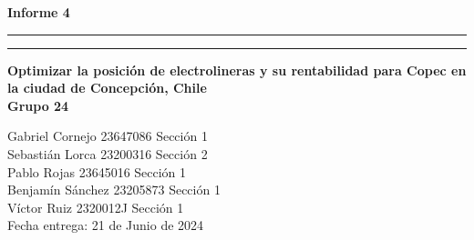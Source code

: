 \documentclass[letterpaper]{article}
\begin{document}
\hfill
\vspace*{6cm}
\begin{center}{}
	\vspace*{2mm}
	{\Huge\bf Informe 4}\\
	\vspace*{4mm}
	\hrule\vspace*{1pt}\hrule
	\vspace*{4mm}
	{\LARGE\bf Optimizar la posici\'on de electrolineras y su rentabilidad para Copec en la ciudad de Concepción, Chile}\\
	\vspace*{4mm}
	{\huge\bf Grupo 24 }\\
	\vspace*{1mm}
\end{center}

\vspace*{50mm}
\flushright

Gabriel Cornejo 23647086 Sección 1\\
Sebastián Lorca 23200316 Sección 2\\
Pablo Rojas 23645016 Sección 1\\
Benjamín Sánchez  23205873 Sección 1\\
Víctor Ruiz 2320012J Sección 1\\


\vspace*{5mm}
{\large Fecha entrega: 21 de Junio de 2024\\}

\newpage
\begin{flushleft}
	\tableofcontents
\end{flushleft}

\newpage
\begin{flushleft}
	\listoftables
	\listoffigures
\end{flushleft}
\end{document}
